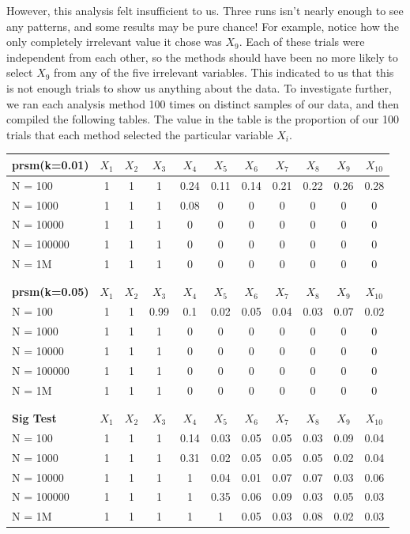 \documentclass[letter]{article}
\begin{document}
However, this analysis felt insufficient to us. Three runs isn't nearly enough to see any patterns, and some results may be pure chance! For example, notice how the only completely irrelevant value it chose was $X_9$. Each of these trials were independent from each other, so the methods should have been no more likely to select $X_9$ from any of the five irrelevant variables. This indicated to us that this is not enough trials to show us anything about the data. To investigate further, we ran each analysis method 100 times on distinct samples of our data, and then compiled the following tables. The value in the table is the proportion of our 100 trials that each method selected the particular variable $X_i$.

\begin{tabular}{| l | c | c | c | c | c | c | c | c | c | c |}



\hline
\textbf{prsm(k=0.01)}&	$X_1$&	$X_2$&	$X_3$&	$X_4$&	$X_5$&	$X_6$&	$X_7$&	$X_8$&	$X_9$&	$X_{10}$\\
\hline
N = 100&			1&	1&	1&	0.24&	0.11&	0.14&	0.21&	0.22&	0.26&	0.28 	\\
N = 1000&			1&	1&	1&	0.08&	0&	0&	0&	0&	0&	0	\\
N = 10000&			1&	1&	1&	0&	0&	0&	0&	0&	0&	0	\\
N = 100000&		1&	1&	1&	0&	0&	0&	0&	0&	0&	0	\\
N = 1M&			1&	1&	1&	0&	0&	0&	0&	0&	0&	0	\\
\hline		

\\
								
									\\		
\hline					
\textbf{prsm(k=0.05)}&	$X_1$&	$X_2$&	$X_3$&	$X_4$&	$X_5$&	$X_6$&	$X_7$&	$X_8$&	$X_9$&	$X_{10}$\\
\hline
N = 100&			1&	1&	0.99&	0.1&	0.02&	0.05&	0.04&	0.03&	0.07&	0.02	\\
N = 1000&			1&	1&	1&	0&	0&	0&	0&	0&	0&	0	\\
N = 10000&			1&	1&	1&	0&	0&	0&	0&	0&	0&	0	\\
N = 100000&		1&	1&	1&	0&	0&	0&	0&	0&	0&	0	\\
N = 1M&			1&	1&	1&	0&	0&	0&	0&	0&	0&	0	\\
\hline
\\

								
											\\
\hline
\textbf{Sig Test}&	$X_1$&	$X_2$&	$X_3$&	$X_4$&	$X_5$&	$X_6$&	$X_7$&	$X_8$&	$X_9$&	$X_{10}$\\
\hline
N = 100&		1&	1&	1&	0.14&	0.03&	0.05&	0.05&	0.03&	0.09&	0.04	\\
N = 1000&		1&	1&	1&	0.31&	0.02&	0.05&	0.05&	0.05&	0.02&	0.04	\\
N = 10000&		1&	1&	1&	1&	0.04&	0.01&	0.07&	0.07&	0.03&	0.06	\\
N = 100000&	1&	1&	1&	1&	0.35&	0.06&	0.09&	0.03&	0.05&	0.03	\\
N = 1M&		1&	1&	1&	1&	1&	0.05&	0.03&	0.08&	0.02&	0.03	\\
\hline
\end{tabular}
\end{document}
